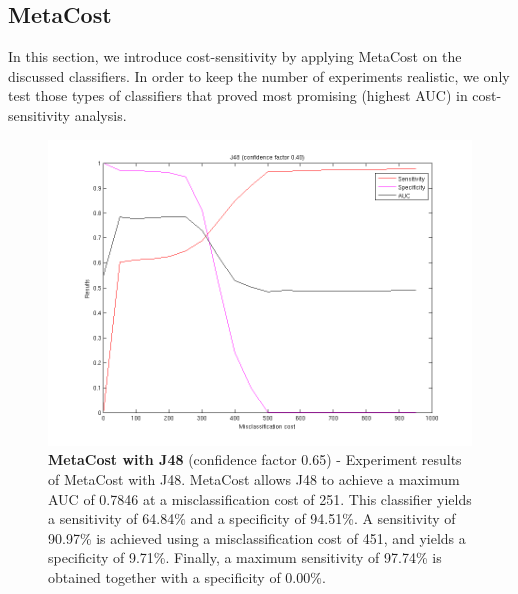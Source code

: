 \newpage
\subsection{MetaCost}\label{exp-metacost}
In this section, we introduce cost-sensitivity by applying MetaCost on the discussed classifiers. In order to keep the number of experiments realistic, we only test those types of classifiers that proved most promising (highest AUC) in cost-sensitivity analysis.  

\begin{figure}[h]
\includegraphics[scale=0.65]{img/MC_J48-confid040.png}
\caption{\textbf{MetaCost with J48} (confidence factor 0.65) - Experiment results of MetaCost with J48. MetaCost allows J48 to achieve a maximum AUC of 0.7846 at a misclassification cost of 251. This classifier yields a sensitivity of 64.84\% and a specificity of 94.51\%. A sensitivity of 90.97\% is achieved using a misclassification cost of 451, and yields a specificity of 9.71\%. Finally, a maximum sensitivity of 97.74\% is obtained together with a specificity of 0.00\%.}
\end{figure}

